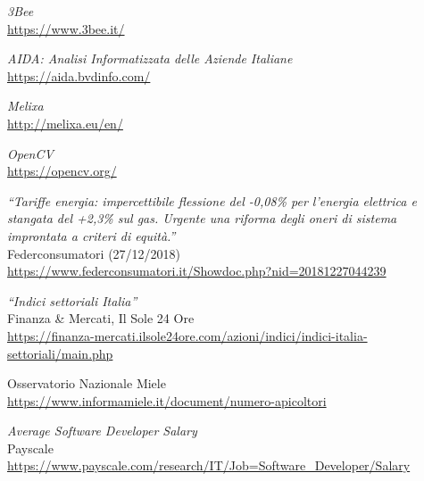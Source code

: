 \newpage
\begin{thebibliography}{99}


\emph{3Bee} \\
\url{https://www.3bee.it/
}

\emph{AIDA: Analisi Informatizzata delle Aziende Italiane} \\
\url{https://aida.bvdinfo.com/}

\emph{Melixa} \\
\url{http://melixa.eu/en/}

\emph{OpenCV} \\
\url{https://opencv.org/}

\emph{``Tariffe energia: impercettibile flessione del -0,08\% per l’energia
elettrica e stangata del +2,3\% sul gas. Urgente una riforma degli oneri di
sistema improntata a criteri di equità.''} \\
Federconsumatori (27/12/2018) \\
\url{https://www.federconsumatori.it/Showdoc.php?nid=20181227044239}

\emph{``Indici settoriali Italia''} \\
Finanza \& Mercati, Il Sole 24 Ore \\
\url{https://finanza-mercati.ilsole24ore.com/azioni/indici/indici-italia-settoriali/main.php}

Osservatorio Nazionale Miele \\
\url{https://www.informamiele.it/document/numero-apicoltori}

\emph{Average Software Developer Salary} \\
Payscale \\
\url{https://www.payscale.com/research/IT/Job=Software_Developer/Salary}



\end{thebibliography}
